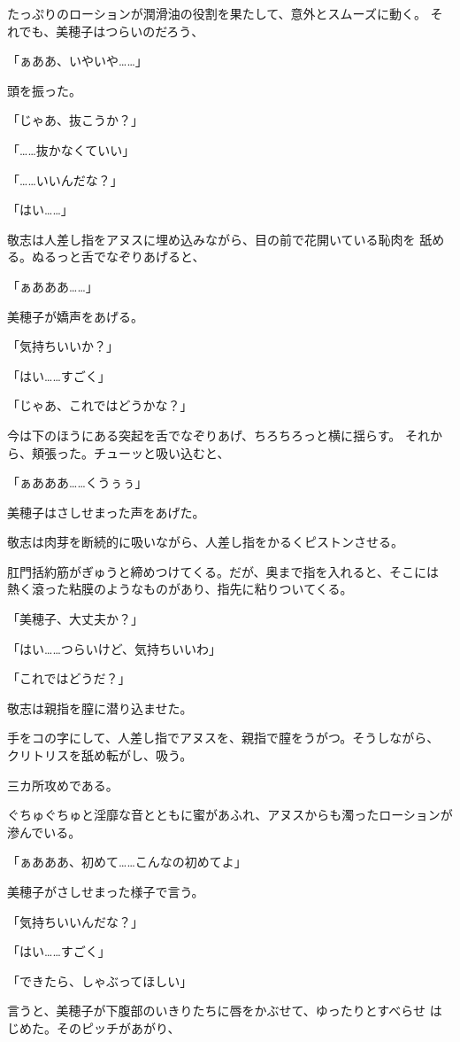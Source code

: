 ﻿\documentclass[
    book,tate,
    line_length=30zw,
    jafontsize=12pt,
    paper=b5j,
    landscape,
    ]{jlreq}
\begin{document}
たっぷりのローションが潤滑油の役割を果たして、意外とスムーズに動く。
それでも、美穂子はつらいのだろう、

「ぁああ、いやいや……」

頭を振った。

「じゃあ、抜こうか？」

「……抜かなくていい」

「……いいんだな？」

「はい……」

敬志は人差し指をアヌスに埋め込みながら、目の前で花開いている恥肉を
舐める。ぬるっと舌でなぞりあげると、

「ぁあああ……」

美穂子が嬌声をあげる。

「気持ちいいか？」

「はい……すごく」

「じゃあ、これではどうかな？」

今は下のほうにある突起を舌でなぞりあげ、ちろちろっと横に揺らす。
それから、頬張った。チューッと吸い込むと、

「ぁあああ……くうぅぅ」

美穂子はさしせまった声をあげた。

敬志は肉芽を断続的に吸いながら、人差し指をかるくピストンさせる。

肛門括約筋がぎゅうと締めつけてくる。だが、奥まで指を入れると、そこには
熱く滾った粘膜のようなものがあり、指先に粘りついてくる。

「美穂子、大丈夫か？」

「はい……つらいけど、気持ちいいわ」

「これではどうだ？」

敬志は親指を膣に潜り込ませた。

手をコの字にして、人差し指でアヌスを、親指で膣をうがつ。そうしながら、
クリトリスを舐め転がし、吸う。

三カ所攻めである。

ぐちゅぐちゅと淫靡な音とともに蜜があふれ、アヌスからも濁ったローションが
滲んでいる。

「ぁあああ、初めて……こんなの初めてよ」

美穂子がさしせまった様子で言う。

「気持ちいいんだな？」

「はい……すごく」

「できたら、しゃぶってほしい」

言うと、美穂子が下腹部のいきりたちに唇をかぶせて、ゆったりとすべらせ
はじめた。そのピッチがあがり、
\end{document}
